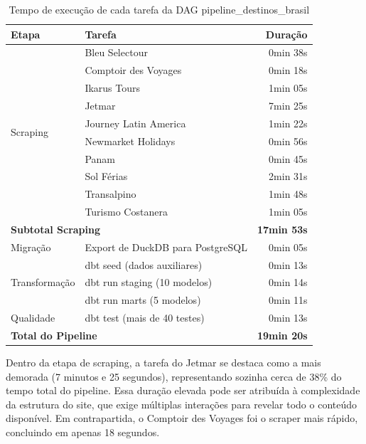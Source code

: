 \begin{table}[H]
\centering
\begin{tabular}{|l|l|r|}
\hline
\textbf{Etapa} & \textbf{Tarefa} & \textbf{Duração} \\ \hline
\multirow{10}{*}{Scraping} 
    & Bleu Selectour           & 0min 38s  \\ \cline{2-3}
    & Comptoir des Voyages     & 0min 18s  \\ \cline{2-3}
    & Ikarus Tours             & 1min 05s  \\ \cline{2-3}
    & Jetmar                   & 7min 25s  \\ \cline{2-3}
    & Journey Latin America    & 1min 22s  \\ \cline{2-3}
    & Newmarket Holidays       & 0min 56s  \\ \cline{2-3}
    & Panam                    & 0min 45s  \\ \cline{2-3}
    & Sol Férias               & 2min 31s  \\ \cline{2-3}
    & Transalpino              & 1min 48s  \\ \cline{2-3}
    & Turismo Costanera        & 1min 05s  \\ \hline
\multicolumn{2}{|l|}{\textbf{Subtotal Scraping}} & \textbf{17min 53s} \\ \hline
Migração & Export de DuckDB para PostgreSQL & 0min 05s \\ \hline
\multirow{3}{*}{Transformação}
    & dbt seed (dados auxiliares)       & 0min 13s  \\ \cline{2-3}
    & dbt run staging (10 modelos)      & 0min 14s  \\ \cline{2-3}
    & dbt run marts (5 modelos)         & 0min 11s  \\ \hline
Qualidade & dbt test (mais de 40 testes) & 0min 13s \\ \hline
\multicolumn{2}{|l|}{\textbf{Total do Pipeline}}  & \textbf{19min 20s} \\ \hline
\end{tabular}
\caption{Tempo de execução de cada tarefa da DAG pipeline\_destinos\_brasil}
\label{tab:tempos_execucao}
\end{table}

Dentro da etapa de scraping, a tarefa do Jetmar se destaca como a mais demorada (7 minutos e 25 segundos), representando sozinha cerca de 38\% do tempo total do pipeline. Essa duração elevada pode ser atribuída à complexidade da estrutura do site, que exige múltiplas interações para revelar todo o conteúdo disponível. Em contrapartida, o Comptoir des Voyages foi o scraper mais rápido, concluindo em apenas 18 segundos.

